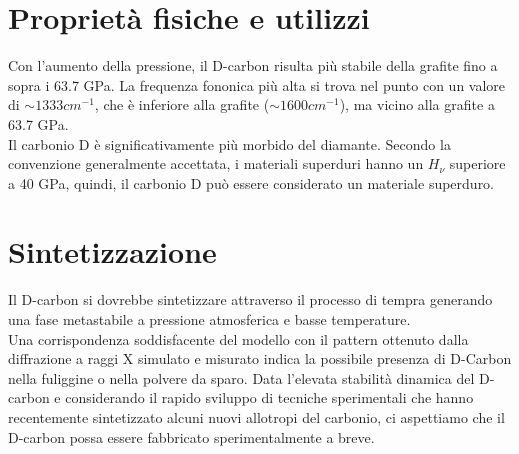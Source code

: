 \documentclass[a4paper,titlepage]{book}
\begin{document}
\section{Proprietà fisiche e utilizzi}
Con l'aumento della pressione, il D-carbon risulta più stabile della grafite fino a sopra i 63.7 GPa. La frequenza fononica più alta si trova nel punto con un valore di $\sim1333 cm^{-1}$, che è inferiore alla grafite ($\sim1600cm^{-1}$), ma vicino alla grafite a 63.7 GPa. \\
Il carbonio D è significativamente più morbido del diamante. Secondo la convenzione generalmente accettata, i materiali superduri hanno un $H_\nu$ superiore a 40 GPa, quindi, il carbonio D può essere considerato un materiale superduro.

\section{Sintetizzazione}
Il D-carbon si dovrebbe sintetizzare attraverso il processo di tempra generando una fase metastabile a pressione atmosferica e basse temperature. \\
Una corrispondenza soddisfacente del modello con il pattern ottenuto dalla diffrazione a raggi X simulato e misurato indica la possibile presenza di D-Carbon nella fuliggine o nella polvere da sparo. Data l'elevata stabilità dinamica del D-carbon e considerando il rapido sviluppo di tecniche sperimentali che hanno recentemente sintetizzato alcuni nuovi allotropi del carbonio, ci aspettiamo che il D-carbon possa essere fabbricato sperimentalmente a breve.
\end{document}
